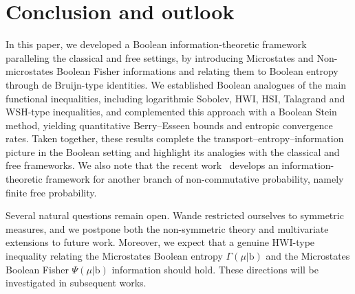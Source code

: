 \documentclass[10pt, reqno]{amsart}
\numberwithin{equation}{section}
\theoremstyle{definition}
\theoremstyle{plain}
\theoremstyle{remark}
\newcommand{\1}{\mathbbm{1}}
\begin{document}
\section*{Conclusion and outlook}
In this paper, we developed a Boolean information-theoretic framework paralleling the classical and free settings, by introducing Microstates and Non-microstates Boolean Fisher informations and relating them to Boolean entropy through de Bruijn-type identities. We established Boolean analogues of the main functional inequalities, including logarithmic Sobolev, HWI, HSI, Talagrand and WSH-type inequalities, and complemented this approach with a Boolean Stein method, yielding quantitative Berry–Esseen bounds and entropic convergence rates. Taken together, these results complete the transport–entropy–information picture in the Boolean setting and highlight its analogies with  the classical and free frameworks. We also note that the recent work~\cite{garza2026finite} develops an information-theoretic framework for another branch of non-commutative probability, namely finite free probability.

Several natural questions remain open. Wande restricted ourselves to symmetric measures, and we postpone both the non-symmetric theory and multivariate extensions to future work. Moreover, we expect that a genuine HWI-type inequality relating the Microstates Boolean entropy $\Gamma(\mu|\mathbb{\mathrm{b}})$ and the Microstates Boolean Fisher $\Psi(\mu|\mathbb{\mathrm{b}})$ information should hold. These directions will be investigated in subsequent works.



\end{document}
